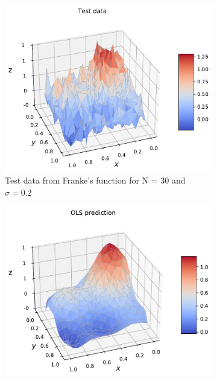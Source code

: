 \documentclass[norsk,a4paper,12pt]{scrartcl}
\begin{document}
\begin{figure}[H]
     \centering
     \begin{subfigure}[b]{0.49\textwidth}
         \centering
         \includegraphics[width=\textwidth]{figures/Franke_test_data.pdf}
         \caption{Test data from Franke's function for N = 30 and $\sigma = 0.2$ }
        \label{fig:test_data_3D}
     \end{subfigure}
    \hfill
     \begin{subfigure}[b]{0.49\textwidth}
         \centering
         \includegraphics[width=\textwidth]{figures/Franke_OLS_predict.pdf}

\end{subfigure}
\end{figure}
\end{document}
